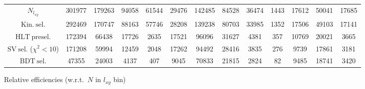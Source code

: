 \documentclass[10pt,a4paper]{article}
\begin{document}
\begin{landscape}
{\begin{tabular}{c|cccc|cccc|cccc}
\midrule
$N_{l_{xy}}$ & 301977 & 179263 & 94058 & 61544 & 29476 & 142485 & 84528 & 36474 & 1443 & 17612 & 50041 & 17685\\
$\mathrm{Kin.\ sel.}$ & 292469 & 170747 & 88163 & 57746 & 28208 & 139238 & 80703 & 33985 & 1352 & 17506 & 49103 & 17141\\
$\mathrm{HLT\ presel.}$ & 172394 & 66438 & 17726 & 2635 & 17521 & 96096 & 31627 & 4381 & 357 & 10769 & 20021 & 3665\\
$\mathrm{SV\ sel.}$ ($\chi^2{<}10$) & 171208 & 59994 & 12459 & 2048 & 17262 & 94492 & 28416 & 3835 & 276 & 9739 & 17861 & 3181\\
$\mathrm{BDT\ sel.}$ & 47355 & 24003 & 4137 & 407 & 9045 & 70833 & 21815 & 2824 & 82 & 9485 & 18741 & 3420\\
\bottomrule
\end{tabular}}

\vspace{18pt}

Relative efficiencies (w.r.t.\ $N$ in $l_{xy}$ bin)


\end{landscape}
\end{document}

